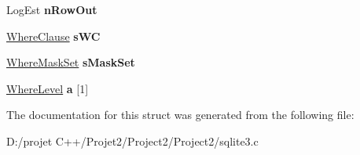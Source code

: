 \begin{DoxyCompactItemize}
\mbox{\label{struct_where_info_a694860f22a9fb8d9edae023fc134cf6f}} 
Log\+Est {\bfseries n\+Row\+Out}
\item 
\mbox{\label{struct_where_info_ab5690a0fa9f78c25a79dd9e50d747fdf}} 
\mbox{\hyperlink{struct_where_clause}{Where\+Clause}} {\bfseries s\+WC}
\item 
\mbox{\label{struct_where_info_ae51ef2af01420b9370a844ee32cc5fc5}} 
\mbox{\hyperlink{struct_where_mask_set}{Where\+Mask\+Set}} {\bfseries s\+Mask\+Set}
\item 
\mbox{\label{struct_where_info_a427337160cbeaf64b23a8241fb10dbf9}} 
\mbox{\hyperlink{struct_where_level}{Where\+Level}} {\bfseries a} \mbox{[}1\mbox{]}
\end{DoxyCompactItemize}


The documentation for this struct was generated from the following file\+:\begin{DoxyCompactItemize}
\item 
D\+:/projet C++/\+Projet2/\+Project2/\+Project2/sqlite3.\+c\end{DoxyCompactItemize}
